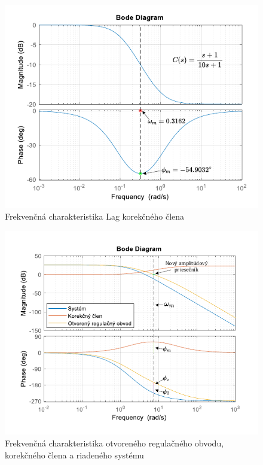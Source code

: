 \documentclass[a4paper,10pt]{article}
\begin{document}
\begin{figure}[ht]
\centering
\includegraphics[scale=0.75]{LagBode}
\caption{Frekvenčná charakteristika Lag korekčného člena}
\end{figure}

\begin{figure}[ht]
\centering
\includegraphics[scale=0.65]{OROBode}
\caption{Frekvenčná charakteristika otvoreného regulačného obvodu, korekčného člena a riadeného systému}
\end{figure}
\end{document}
